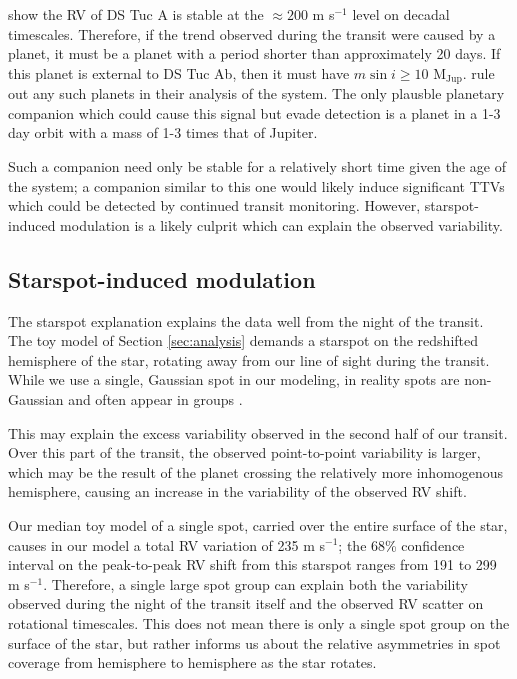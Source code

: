 \documentclass[twocolumn]{aastex63}
\newcommand{\mjup}{{M$_\textrm{Jup}$}}
\begin{document}
\citet{Benatti19} show the RV of DS Tuc A is stable at the $\approx 200$ m s$^{-1}$ level on decadal timescales. 
Therefore, if the trend observed during the transit were caused by a planet, it must be a planet with a period shorter than approximately 20 days. 
If this planet is external to DS Tuc Ab, then it must have $m \sin i \geq 10$ \mjup. 
\citet{Benatti19} rule out any such planets in their analysis of the system.
The only plausble planetary companion which could cause this signal but evade detection is a planet in a 1-3 day orbit with a mass of 1-3 times that of Jupiter. 

Such a companion need only be stable for a relatively short time given the age of the system; a companion similar to this one would likely induce significant TTVs which could be detected by continued transit monitoring.
However, starspot-induced modulation is a likely culprit which can explain the observed variability.


\subsection{Starspot-induced modulation}

The starspot explanation explains the data well from the night of the transit.
The toy model of Section \ref{sec:analysis} demands a starspot on the redshifted hemisphere of the star, rotating away from our line of sight during the transit. 
While we use a single, Gaussian spot in our modeling, in reality spots are non-Gaussian and often appear in groups \citep[e.g.][]{Kilcik11}.

This may explain the excess variability observed in the second half of our transit. 
Over this part of the transit, the observed point-to-point variability is larger, which may be the result of the planet crossing the relatively more inhomogenous hemisphere, causing an increase in the variability of the observed RV shift.

Our median toy model of a single spot, carried over the entire surface of the star, causes in our model a total RV variation of 235 m s$^{-1}$; the 68\% confidence interval on the peak-to-peak RV shift from this starspot ranges from 191 to 299 m s$^{-1}$.
Therefore, a single large spot group can explain both the variability observed during the night of the transit itself and the observed RV scatter on rotational timescales.
This does not mean there is only a single spot group on the surface of the star, but rather informs us about the relative asymmetries in spot coverage from hemisphere to hemisphere as the star rotates.
\end{document}
